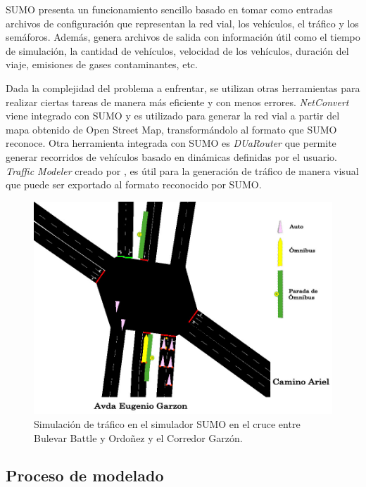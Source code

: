 SUMO presenta un funcionamiento sencillo basado en tomar como entradas archivos de configuración que representan la red vial, los vehículos, el tráfico y los semáforos. Además, genera archivos de salida con información útil como el tiempo de simulación, la cantidad de vehículos, velocidad de los vehículos, duración del viaje, emisiones de gases contaminantes, etc. 

Dada la complejidad del problema a enfrentar, se utilizan otras herramientas para realizar ciertas tareas de manera más eficiente y con menos errores. \emph{NetConvert} viene integrado con SUMO y es utilizado para generar la red vial a partir del mapa obtenido de Open Street Map, transformándolo al formato que SUMO reconoce. Otra herramienta integrada con SUMO es \emph{DUaRouter} que permite generar recorridos de vehículos basado en dinámicas definidas por el usuario. \emph{Traffic Modeler} creado por \citet{TrafficModeler}, es útil para la generación de tráfico de manera visual que puede ser exportado al formato reconocido por SUMO. 
	


\begin{figure}[H]
	\centering
	\includegraphics[width=0.9\linewidth]{Figures/sim1}
	\caption[Simulación de trafico en el simulador SUMO.]{Simulación de tráfico en el simulador SUMO en el cruce entre Bulevar Battle y Ordoñez y el Corredor Garzón.}
	\label{fig:sim1}
\end{figure}



\subsection{Proceso de modelado}

